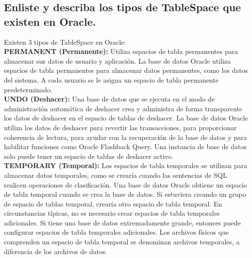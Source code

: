 \documentclass[12pt,letterpaper]{article}
\begin{document}
\subsection{Enliste y describa los tipos de TableSpace que existen en Oracle.}
\vspace{12pt}
Existen 3 tipos de TableSpace en Oracle:
\vspace{10pt}\\
\textbf{PERMANENT (Permanente):} Utiliza espacios de tabla permanentes para almacenar sus datos de usuario y aplicación. La base de datos Oracle utiliza espacios de tabla permanentes para almacenar datos permanentes, como los datos del sistema. A cada usuario se le asigna un espacio de tabla permanente predeterminado.
\vspace{10pt}\\
\textbf{UNDO (Deshacer):} Una base de datos que se ejecuta en el modo de administración automática de deshacer crea y administra de forma transparente los datos de deshacer en el espacio de tablas de deshacer. La base de datos Oracle utiliza los datos de deshacer para revertir las transacciones, para proporcionar coherencia de lectura, para ayudar con la recuperación de la base de datos y para habilitar funciones como Oracle Flashback Query. Una instancia de base de datos solo puede tener un espacio de tablas de deshacer activo.
\vspace{10pt}\\
\textbf{TEMPORARY (Temporal):} Los espacios de tabla temporales se utilizan para almacenar datos temporales, como se crearía cuando las sentencias de SQL realicen operaciones de clasificación. Una base de datos Oracle obtiene un espacio de tabla temporal cuando se crea la base de datos. Si estuviera creando un grupo de espacio de tablas temporal, crearía otro espacio de tabla temporal. En circunstancias típicas, no es necesario crear espacios de tabla temporales adicionales. Si tiene una base de datos extremadamente grande, entonces puede configurar espacios de tabla temporales adicionales.
Los archivos físicos que comprenden un espacio de tabla temporal se denominan archivos temporales, a diferencia de los archivos de datos.
\vspace{10pt}\\
\end{document}
